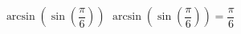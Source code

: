  {$\arcsin\left(\sin\left(\dfrac{\pi}{6}\right) \right)$ }
{ $\arcsin\left(\sin\left(\dfrac{\pi}{6}\right) \right) = \dfrac{\pi}{6}$}
